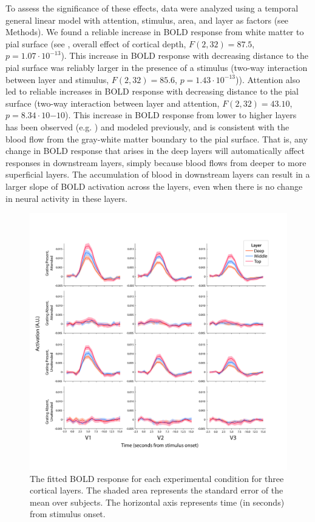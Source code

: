 \documentclass[9pt,lineno]{aperture}
\begin{document}
To assess the significance of these effects, data were analyzed using a temporal general linear model with attention, stimulus, area, and layer as factors (see Methods). We found a reliable increase in BOLD response from white matter to pial surface (see , overall effect of cortical depth, $F(2, 32)=87.5$, $p=1.07 \cdot 10^{-13}$). This increase in BOLD response with decreasing distance to the pial surface was reliably larger in the presence of a stimulus (two-way interaction between layer and stimulus, $F(2, 32)=85.6$, $p=1.43 \cdot 10^{-13}$)). Attention also led to reliable increases in BOLD response with decreasing distance to the pial surface (two-way interaction between layer and attention, $F(2,32)=43.10$, $p=8.34 \cdot 10{-10}$). 
This increase in BOLD response from lower to higher layers has been observed (e.g. \citet{Koopmans2010,Polimeni2010,Koopmans2011,Olman2012,Huber2018}) and modeled \citep{Markuerkiaga2016,Havlicek2020} previously, and is consistent with the blood flow from the gray-white matter boundary to the pial surface. That is, any change in BOLD response that arises in the deep layers will automatically affect responses in downstream layers, simply because blood flows from deeper to more superficial layers. The accumulation of blood in downstream layers can result in a larger slope of BOLD activation across the layers, even when there is no change in neural activity in these layers.
\begin{figure}
\includegraphics[width=\linewidth]{img/fir_layers.png}
\caption{The fitted BOLD response for each experimental condition for three cortical layers. The shaded area represents the standard error of the mean over subjects. The horizontal axis represents time (in seconds) from stimulus onset.}
\label{fig:fir_layers}
\end{figure}
\end{document}
